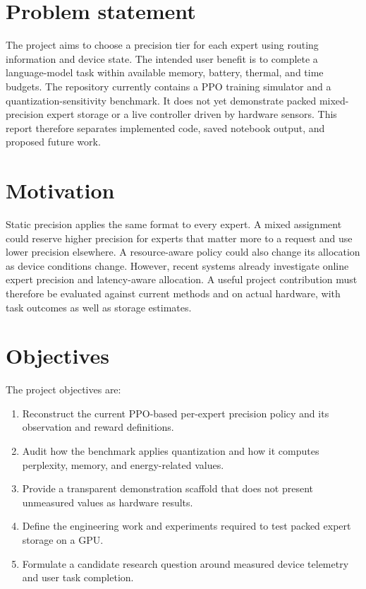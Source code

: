 \documentclass[12pt,a4paper]{report}
\begin{document}
\section{Problem statement}
The project aims to choose a precision tier for each expert using routing information and device state. The intended user benefit is to complete a language-model task within available memory, battery, thermal, and time budgets. The repository currently contains a PPO training simulator and a quantization-sensitivity benchmark. It does not yet demonstrate packed mixed-precision expert storage or a live controller driven by hardware sensors. This report therefore separates implemented code, saved notebook output, and proposed future work.

\section{Motivation}
Static precision applies the same format to every expert. A mixed assignment could reserve higher precision for experts that matter more to a request and use lower precision elsewhere. A resource-aware policy could also change its allocation as device conditions change. However, recent systems already investigate online expert precision and latency-aware allocation. A useful project contribution must therefore be evaluated against current methods and on actual hardware, with task outcomes as well as storage estimates.

\section{Objectives}
The project objectives are:
\begin{enumerate}
  \item Reconstruct the current PPO-based per-expert precision policy and its observation and reward definitions.
  \item Audit how the benchmark applies quantization and how it computes perplexity, memory, and energy-related values.
  \item Provide a transparent demonstration scaffold that does not present unmeasured values as hardware results.
  \item Define the engineering work and experiments required to test packed expert storage on a GPU.
  \item Formulate a candidate research question around measured device telemetry and user task completion.
\end{enumerate}
\end{document}
